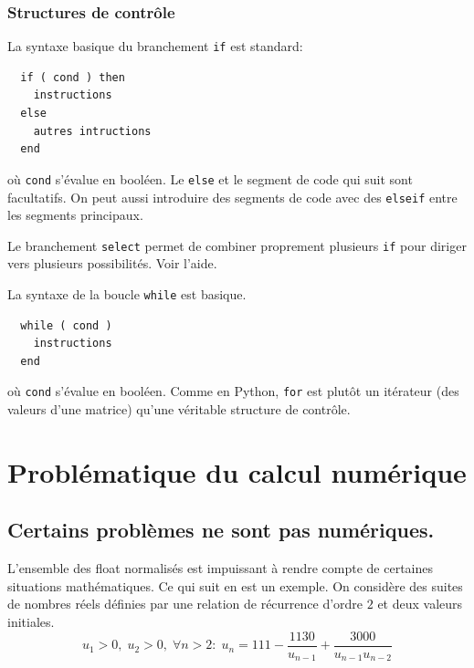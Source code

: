 \subsubsection{Structures de contrôle}
La syntaxe basique du branchement \texttt{if} est standard:
\begin{verbatim}
  if ( cond ) then
    instructions
  else
    autres intructions
  end
\end{verbatim}
où \texttt{cond} s'évalue en booléen. Le \texttt{else} et le segment de code qui suit sont facultatifs. On peut aussi introduire des segments de code avec des \texttt{elseif} entre les segments principaux.

Le branchement \texttt{select} permet de combiner proprement plusieurs \texttt{if} pour diriger vers plusieurs possibilités. Voir l'aide.

La syntaxe de la boucle \texttt{while} est basique.
\begin{verbatim}
  while ( cond )
    instructions
  end
\end{verbatim}
où \texttt{cond} s'évalue en booléen. Comme en Python, \texttt{for} est plutôt un itérateur (des valeurs d'une matrice) qu'une véritable structure de contrôle.


\section{Problématique du calcul numérique}
\subsection{Certains problèmes ne sont pas numériques.}
L'ensemble des float normalisés est impuissant à rendre compte de certaines situations mathématiques. Ce qui suit en est un exemple.\newline
On considère des suites de nombres réels définies par une relation de récurrence d'ordre $2$ et deux valeurs initiales.
\begin{displaymath}
  u_1>0,\; u_2>0,\;
  \forall n>2:\;
  u_{n}= 111 - \frac{1130}{u_{n-1}} + \frac{3000}{u_{n-1}u_{n-2}}
\end{displaymath}

